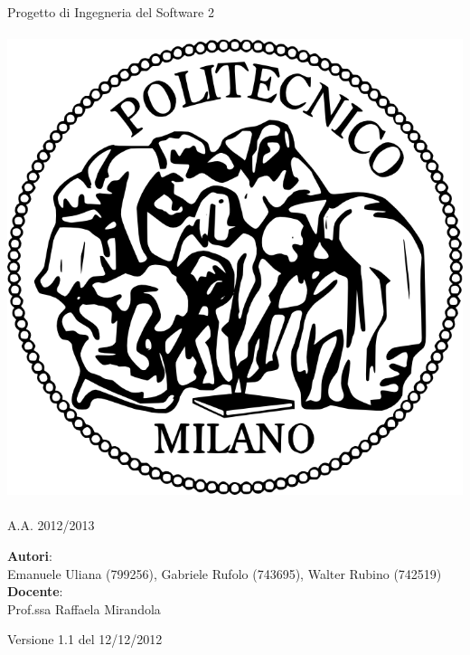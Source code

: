\documentclass[a4paper,12pt]{article}
\begin{document}
\vspace*{\fill}
\begin{center}
{\fontsize{28}{10} \selectfont Progetto di Ingegneria del Software 2 \\[2\baselineskip]} {\fontsize{42}{10} \selectfont {\bfseries SWIMv2}} \\[4\baselineskip]
\includegraphics[scale=0.4]{polimi} \\[4\baselineskip]
{\fontsize{28}{10} \selectfont {\bfseries Requirements Analysis Specification Document} \\[2\baselineskip] A.A. 2012/2013}
\end{center}
\begin{flushleft}
{\fontsize{18}{10}
{\bfseries Autori}: \\ Emanuele Uliana (799256), Gabriele Rufolo (743695), Walter Rubino (742519) \\[1\baselineskip]
{\bfseries Docente}: \\ Prof.ssa Raffaela Mirandola
}
\end{flushleft}
\vspace*{\fill}
\begin{center}
Versione 1.1 del 12/12/2012 \\
\end{center}

\clearpage
\end{document}
